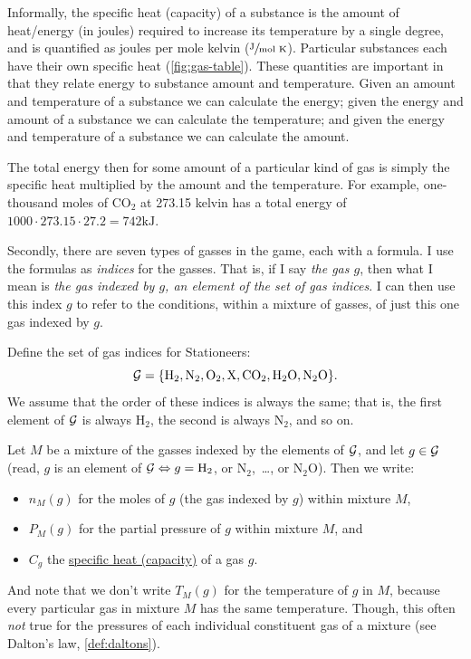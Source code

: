 \documentclass{article}
\newcommand{\Hyd}{\mathrm{H}_2}
\newcommand{\Nit}{\mathrm{N}_2}
\newcommand{\Ox}{\mathrm{O}_2}
\newcommand{\Pol}{\mathrm{X}}
\newcommand{\CDiox}{\mathrm{CO}_2}
\newcommand{\Water}{\mathrm{H}_2\mathrm{O}}
\newcommand{\NiOx}{\mathrm{N}_2\mathrm{O}}
\begin{document}
\begin{definition*}
    Informally, the specific heat (capacity) of a substance is the amount of heat/energy (in joules)
    required to increase its temperature by a single degree, and is quantified as joules per mole
    kelvin ($\sfrac{\text{J}}{\text{mol K}}$). Particular substances each have their
    own specific heat (\cref{fig:gas-table}). These quantities are important in that they relate
    energy to substance amount and temperature. Given an amount and temperature of a substance we
    can calculate the energy; given the energy and amount of a substance we can calculate the
    temperature; and given the energy and temperature of a substance we can calculate the amount.

    The total energy then for some amount of a particular kind of gas is simply the specific heat
    multiplied by the amount and the temperature. For example, one-thousand moles of $\CDiox$ at
    273.15 kelvin has a total energy of $1000\cdot 273.15\cdot 27.2=742\text{kJ}$.
\end{definition*}
Secondly, there are seven types of gasses in the game, each with a formula. I use the formulas as
\emph{indices} for the gasses. That is, if I say \emph{the gas $g$}, then what I mean is \emph{the
gas indexed by $g$, an element of the set of gas indices}. I can then use this index $g$ to refer to
the conditions, within a mixture of gasses, of just this one gas indexed by $g$.
\begin{definition}
    Define the set of gas indices for Stationeers:
    \[
        \calG = \{\Hyd,\Nit,\Ox,\Pol,\CDiox,\Water,\NiOx\}.
    \]
    We assume that the order of these indices is always the same;
    that is, the first element of $\operatorname{{\mathcal{G}}}$ is always $\Hyd$, the second is always $\Nit$, and so on.

    Let $M$ be a mixture of the gasses indexed by the elements of $\operatorname{{\mathcal{G}}}$, and
    let $g\in\operatorname{{\mathcal{G}}}$ (read, $g$ is an element of $\calG\Leftrightarrow g=\Hyd$, or $\Nit$,\ \ldots, or $\NiOx$).
    Then we write:
    \begin{itemize}
        \item $n_M(g)$ for the moles of $g$ (the gas indexed by $g$) within mixture $M$,
        \item $P_M(g)$ for the partial pressure of $g$ within mixture $M$, and
        \item $C_g$ the \href{https://en.wikipedia.org/wiki/Specific_heat_capacity}{specific heat
            (capacity)} of a gas $g$.
    \end{itemize}
    And note that we don't write $T_M(g)$ for the temperature of $g$ in $M$, because every
    particular gas in mixture $M$ has the same temperature. Though, this often \emph{not} true for
    the pressures of each individual constituent gas of a mixture (see Dalton's law,
    \cref{def:daltons}).
\end{definition}
\end{document}
